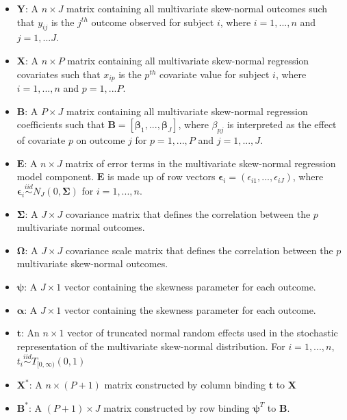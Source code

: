 \documentclass{article}
\begin{document}
\begin{itemize}

    \item $\mathbf{Y}$: A $n \times J$ matrix containing all multivariate skew-normal  outcomes such that $y_{ij}$ is the $j^{th}$ outcome observed for subject $i$, where $i = 1,...,n$ and $j = 1,...J$.
    
    \item $\mathbf{X}$: A $n \times P$ matrix containing all multivariate skew-normal regression covariates such that $x_{ip}$ is the $p^{th}$ covariate value for subject $i$, where $i = 1,...,n$ and $p = 1,...P$.
    
    \item $\mathbf{B}$: A $P \times J$ matrix containing all multivariate skew-normal regression coefficients such that $\mathbf{B} = \left [ \boldsymbol\beta_1,...,\boldsymbol\beta_J \right ]$, where $\beta_{pj}$ is interpreted as the effect of covariate $p$ on outcome $j$ for $p = 1,...,P$ and $j = 1,...,J$.
    
    \item $\mathbf{E}$: A $n \times J$ matrix of error terms in the multivariate skew-normal regression model component. $\mathbf{E}$ is made up of row vectors $\boldsymbol\epsilon_i = (\epsilon_{i1},...,\epsilon_{iJ})$, where $ \boldsymbol\epsilon_i \stackrel{iid}{\sim} N_J(0, \boldsymbol\Sigma)$ for $i = 1,...,n$.
    
    \item $\boldsymbol\Sigma$: A $J \times J$ covariance matrix that defines the correlation between the $p$ multivariate normal outcomes. 
    
    \item $\boldsymbol\Omega$: A $J \times J$ covariance scale matrix that defines the correlation between the $p$ multivariate skew-normal outcomes. 
    
    \item $\boldsymbol\psi$: A $J \times 1$ vector containing the skewness parameter for each outcome.
    
    \item $\boldsymbol\alpha$: A $J \times 1$ vector containing the skewness parameter for each outcome.
    
    \item $\mathbf{t}$: An $n \times 1$ vector of truncated normal random effects used in the stochastic representation of the multivariate skew-normal distribution. For $i = 1,...,n$, $t_i \stackrel{iid}{\sim}T_{[0,\infty)}(0,1)$
    
    \item $\mathbf{X}^*$: A $n \times (P + 1)$ matrix constructed by column binding $\mathbf{t}$ to $\mathbf{X}$
    
    \item $\mathbf{B}^*$: A $(P+1) \times J$ matrix constructed by row binding $\boldsymbol\psi^T$ to $\mathbf{B}$.

\end{itemize}
\end{document}
